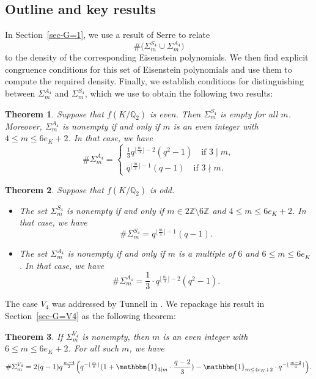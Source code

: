 \documentclass[11pt]{amsart}
\theoremstyle{theorem}
\newtheorem{theorem}{Theorem}
\theoremstyle{example}
\theoremstyle{definition}
\numberwithin{theorem}{section}
\numberwithin{theorem}{section}
\newcommand{\Z}{\mathbb{Z}}
\newcommand{\Q}{\mathbb{Q}}
\begin{document}
\subsection{Outline and key results}

In Section~\ref{sec-G=1}, we use a result of Serre to relate 
$$
\#\Big(\Sigma_{m}^{S_4} \cup \Sigma_{m}^{A_4}\Big)
$$
to the density of the corresponding Eisenstein polynomials. We then find explicit congruence conditions for this set of Eisenstein polynomials and use them to compute the required density. Finally, we establish conditions for distinguishing between $\Sigma_{m}^{A_4}$ and $\Sigma_{m}^{S_4}$, which we use to obtain the following two results:

\begin{theorem}
    \label{thm-S4-A4-f-even}
    Suppose that $f(K/\Q_2)$ is even. Then $\Sigma_{m}^{S_4}$ is empty for all $m$. Moreover, $\Sigma_{m}^{A_4}$ is nonempty if and only if $m$ is an even integer with $4 \leq m \leq 6e_K + 2$. In that case, we have 
    $$
    \#\Sigma_{m}^{A_4} = \begin{cases}
        \frac{1}{3}q^{\lfloor \frac{m}{3}\rfloor - 2}(q^2-1)\quad\text{if $3 \mid m$},
        \\
        q^{\lfloor \frac{m}{3}\rfloor - 1}(q-1)\quad\text{if $3\nmid m$}.
    \end{cases}
    $$
\end{theorem}
\begin{theorem}
    \label{thm-S4-A4-f-odd}
    Suppose that $f(K/\Q_2)$ is odd. 
    \begin{itemize} 
        \item The set $\Sigma_{m}^{S_4}$ is nonempty if and only if $m \in 2\Z \setminus 6\Z$ and $4 \leq m \leq 6e_K + 2$. In that case, we have
    $$
    \#\Sigma_{m}^{S_4} = q^{\lfloor\frac{m}{3}\rfloor - 1}(q-1). 
    $$
    \item The set $\Sigma_{m}^{A_4}$ is nonempty if and only if $m$ is a multiple of $6$ and $6 \leq m \leq 6e_K$. In that case, we have
    $$
    \#\Sigma_{m}^{A_4} = \frac{1}{3}\cdot q^{\lfloor \frac{m}{3}\rfloor - 2}(q^2-1).
    $$
    \end{itemize}
\end{theorem}
The case $V_4$ was addressed by Tunnell in \cite{tunnell}. We repackage his result in Section~\ref{sec-G=V4} as the following theorem:
\begin{theorem}
    \label{thm-size-of-Sigma-V4-m}
    If $\Sigma_{m}^{V_4}$ is nonempty, then $m$ is an even integer with $6 \leq m \leq 6e_K + 2$. For all such $m$, we have 
    $$
\#\Sigma_{m}^{V_4} = 2(q-1)q^{\frac{m-4}{2}}\Big(
    q^{-\lfloor \frac{m}{6}\rfloor}(1 + \mathbbm{1}_{3 \mid m}\cdot \frac{q-2}{3}) - \mathbbm{1}_{m\leq 4e_K + 2}\cdot q^{-\lfloor\frac{m-2}{4}\rfloor}
\Big).
$$
\end{theorem}
\end{document}
